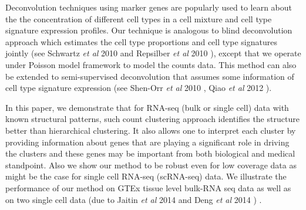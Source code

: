 Deconvolution techniques using marker genes are popularly used to learn about the the concentration of different cell types in a cell mixture and cell type signature expression profiles. Our technique is analogous to blind deconvolution approach which estimates the cell type proportions and cell type signatures jointly (see Schwartz \textit{et al} 2010 \cite{Schwartz2010} and Repsilber \textit{et al} 2010 \cite{Repsilber2010}), except that we operate under Poisson model framework to model the counts data. This method can also be extended to semi-supervised deconvolution that assumes some information of cell type signature expression (see Shen-Orr \textit{et al} 2010 \cite{Shen-Orr2010},  Qiao \textit{et al} 2012 \cite{Qiao2012}). 

In this paper, we demonstrate that for RNA-seq (bulk or single cell) data with known structural patterns, such count clustering approach identifies the structure better than hierarchical clustering. It also allows one to interpret each cluster by providing information about genes that are playing a significant role in driving the clusters and these genes may be important from both biological and medical standpoint. Also we show our method to be robust even for low coverage data as might be the case for single cell RNA-seq (scRNA-seq) data.
We illustrate the performance of our method on GTEx tissue level  bulk-RNA seq data as well as on two single cell data (due to Jaitin \textit{et al} 2014 \cite{Jaitin2014} and Deng \textit{et al} 2014 \cite{Deng2014}) . 


